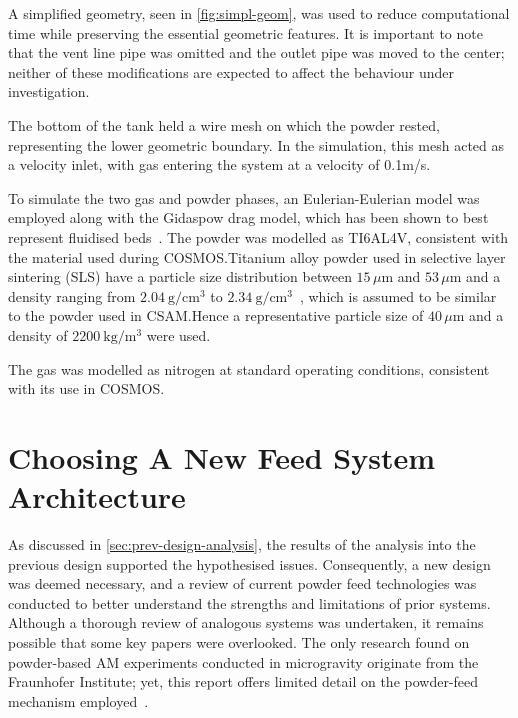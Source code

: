 A simplified geometry, seen in \autoref{fig:simpl-geom}, was used to reduce computational time while preserving the essential geometric features. It is important to note that the vent line pipe was omitted and the outlet pipe was moved to the center; neither of these modifications are expected to affect the behaviour under investigation. 

The bottom of the tank held a wire mesh on which the powder rested, representing the lower geometric boundary. In the simulation, this mesh acted as a velocity inlet, with gas entering the system at a velocity of 0.1m/s. 

To simulate the two gas and powder phases, an Eulerian-Eulerian model was employed along with the Gidaspow drag model, which has been shown to best represent fluidised beds~\cite{C6RA28615A}. The powder was modelled as TI6AL4V, consistent with the material used during COSMOS.\@ Titanium alloy powder used in selective layer sintering (SLS) have a particle size distribution between $15\,\mu\mathrm{m}$ and $53\,\mu\mathrm{m}$ and a density ranging from $2.04\ \mathrm{g/cm^3}$ to $2.34\ \mathrm{g/cm^3}$~\cite{ma17040952}, which is assumed to be similar to the powder used in CSAM.\@ Hence a representative particle size of $40\,\mu\mathrm{m}$ and a density of $2200\ \mathrm{kg/m^3}$ were used. 

The gas was modelled as nitrogen at standard operating conditions, consistent with its use in COSMOS.\@

\section{Choosing A New Feed System Architecture}\label{sec:system_architecture}
As discussed in \autoref{sec:prev-design-analysis}, the results of the analysis into the previous design supported the hypothesised issues. Consequently, a new design was deemed necessary, and a review of current powder feed technologies was conducted to better understand the strengths and limitations of prior systems. Although a thorough review of analogous systems was undertaken, it remains possible that some key papers were overlooked. The only research found on powder-based AM experiments conducted in microgravity originate from the Fraunhofer Institute; yet, this report offers limited detail on the powder-feed mechanism employed~\cite{OVERMEYER2025}. 

